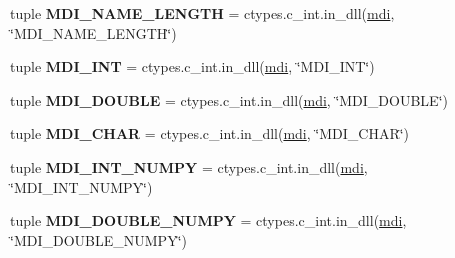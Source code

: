 \begin{DoxyCompactItemize}
\item 
\hypertarget{namespacemolssi__driver__interface_1_1mdi_a3be426ffa2c8696fe44d1bec166a21a8}{tuple {\bfseries M\-D\-I\-\_\-\-N\-A\-M\-E\-\_\-\-L\-E\-N\-G\-T\-H} = ctypes.\-c\-\_\-int.\-in\-\_\-dll(\hyperlink{classmdi}{mdi}, \char`\"{}M\-D\-I\-\_\-\-N\-A\-M\-E\-\_\-\-L\-E\-N\-G\-T\-H\char`\"{})}\label{namespacemolssi__driver__interface_1_1mdi_a3be426ffa2c8696fe44d1bec166a21a8}

\item 
\hypertarget{namespacemolssi__driver__interface_1_1mdi_a451ed61cd0edd447d5a559ec99d479d5}{tuple {\bfseries M\-D\-I\-\_\-\-I\-N\-T} = ctypes.\-c\-\_\-int.\-in\-\_\-dll(\hyperlink{classmdi}{mdi}, \char`\"{}M\-D\-I\-\_\-\-I\-N\-T\char`\"{})}\label{namespacemolssi__driver__interface_1_1mdi_a451ed61cd0edd447d5a559ec99d479d5}

\item 
\hypertarget{namespacemolssi__driver__interface_1_1mdi_a52d5a1823d4b38b60df486d5b7a76d83}{tuple {\bfseries M\-D\-I\-\_\-\-D\-O\-U\-B\-L\-E} = ctypes.\-c\-\_\-int.\-in\-\_\-dll(\hyperlink{classmdi}{mdi}, \char`\"{}M\-D\-I\-\_\-\-D\-O\-U\-B\-L\-E\char`\"{})}\label{namespacemolssi__driver__interface_1_1mdi_a52d5a1823d4b38b60df486d5b7a76d83}

\item 
\hypertarget{namespacemolssi__driver__interface_1_1mdi_a2f9bb33fbf05ad85f489344f098c19e4}{tuple {\bfseries M\-D\-I\-\_\-\-C\-H\-A\-R} = ctypes.\-c\-\_\-int.\-in\-\_\-dll(\hyperlink{classmdi}{mdi}, \char`\"{}M\-D\-I\-\_\-\-C\-H\-A\-R\char`\"{})}\label{namespacemolssi__driver__interface_1_1mdi_a2f9bb33fbf05ad85f489344f098c19e4}

\item 
\hypertarget{namespacemolssi__driver__interface_1_1mdi_a30427c26974ad9a7bca4651b4a347896}{tuple {\bfseries M\-D\-I\-\_\-\-I\-N\-T\-\_\-\-N\-U\-M\-P\-Y} = ctypes.\-c\-\_\-int.\-in\-\_\-dll(\hyperlink{classmdi}{mdi}, \char`\"{}M\-D\-I\-\_\-\-I\-N\-T\-\_\-\-N\-U\-M\-P\-Y\char`\"{})}\label{namespacemolssi__driver__interface_1_1mdi_a30427c26974ad9a7bca4651b4a347896}

\item 
\hypertarget{namespacemolssi__driver__interface_1_1mdi_ae23a31205ba45db924a6cd8f6851c301}{tuple {\bfseries M\-D\-I\-\_\-\-D\-O\-U\-B\-L\-E\-\_\-\-N\-U\-M\-P\-Y} = ctypes.\-c\-\_\-int.\-in\-\_\-dll(\hyperlink{classmdi}{mdi}, \char`\"{}M\-D\-I\-\_\-\-D\-O\-U\-B\-L\-E\-\_\-\-N\-U\-M\-P\-Y\char`\"{})}\label{namespacemolssi__driver__interface_1_1mdi_ae23a31205ba45db924a6cd8f6851c301}


\end{DoxyCompactItemize}
